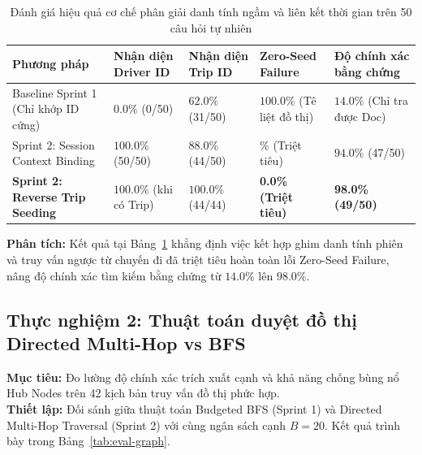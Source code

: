 \documentclass[a4paper,11pt]{article}
\begin{document}
\begin{table}[htbp]
\centering
\footnotesize
\caption{Đánh giá hiệu quả cơ chế phân giải danh tính ngầm và liên kết thời gian trên 50 câu hỏi tự nhiên}
\label{tab:eval-identity}
\vspace{0.15cm}
\begin{tabularx}{\textwidth}{>{\raggedright\arraybackslash}X>{\centering\arraybackslash}X>{\centering\arraybackslash}X>{\centering\arraybackslash}X>{\centering\arraybackslash}X}
\toprule
\textbf{Phương pháp} & \textbf{Nhận diện Driver ID} & \textbf{Nhận diện Trip ID} & \textbf{Zero-Seed Failure} & \textbf{Độ chính xác bằng chứng} \\
\midrule
Baseline Sprint 1 (Chỉ khớp ID cứng) & $0.0\%$ (0/50) & $62.0\%$ (31/50) & $100.0\%$ (Tê liệt đồ thị) & $14.0\%$ (Chỉ tra được Doc) \\
Sprint 2: Session Context Binding & $100.0\%$ (50/50) & $88.0\%$ (44/50) & 0.0\% (Triệt tiêu) & $94.0\%$ (47/50) \\
\textbf{Sprint 2: Reverse Trip Seeding} & $100.0\%$ (khi có Trip) & $100.0\%$ (44/44) & \textbf{0.0\% (Triệt tiêu)} & \textbf{98.0\% (49/50)} \\
\bottomrule
\end{tabularx}
\end{table}

\textbf{Phân tích:} Kết quả tại Bảng~\ref{tab:eval-identity} khẳng định việc kết hợp ghim danh tính phiên và truy vấn ngược từ chuyến đi đã triệt tiêu hoàn toàn lỗi Zero-Seed Failure, nâng độ chính xác tìm kiếm bằng chứng từ $14.0\%$ lên $98.0\%$.

\subsection{Thực nghiệm 2: Thuật toán duyệt đồ thị Directed Multi-Hop vs BFS}
\label{sec:eval-graph}
\textbf{Mục tiêu:} Đo lường độ chính xác trích xuất cạnh và khả năng chống bùng nổ Hub Nodes trên 42 kịch bản truy vấn đồ thị phức hợp.\\
\textbf{Thiết lập:} Đối sánh giữa thuật toán Budgeted BFS (Sprint 1) và Directed Multi-Hop Traversal (Sprint 2) với cùng ngân sách cạnh $B = 20$. Kết quả trình bày trong Bảng~\ref{tab:eval-graph}.
\end{document}

